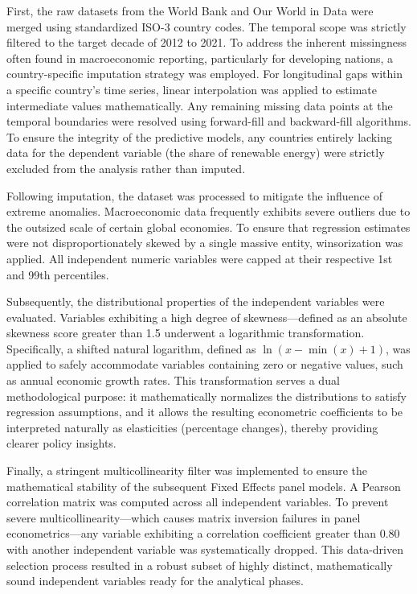 \documentclass[a4paper,11pt]{article}
\begin{document}
First, the raw datasets from the World Bank and Our World in Data were merged using standardized ISO-3 country codes.
The temporal scope was strictly filtered to the target decade of 2012 to 2021.
To address the inherent missingness often found in macroeconomic reporting, particularly for developing nations, a country-specific imputation strategy was employed.
For longitudinal gaps within a specific country's time series, linear interpolation was applied to estimate intermediate values mathematically.
Any remaining missing data points at the temporal boundaries were resolved using forward-fill and backward-fill algorithms.
To ensure the integrity of the predictive models, any countries entirely lacking data for the dependent variable (the share of renewable energy) were strictly excluded from the analysis rather than imputed.

Following imputation, the dataset was processed to mitigate the influence of extreme anomalies.
Macroeconomic data frequently exhibits severe outliers due to the outsized scale of certain global economies.
To ensure that regression estimates were not disproportionately skewed by a single massive entity, winsorization was applied.
All independent numeric variables were capped at their respective 1st and 99th percentiles.

Subsequently, the distributional properties of the independent variables were evaluated.
Variables exhibiting a high degree of skewness—defined as an absolute skewness score greater than 1.5 underwent a logarithmic transformation.
Specifically, a shifted natural logarithm, defined as $\ln(x - \min(x) + 1)$, was applied to safely accommodate variables containing zero or negative values, such as annual economic growth rates.
This transformation serves a dual methodological purpose: it mathematically normalizes the distributions to satisfy regression assumptions, and it allows the resulting econometric coefficients to be interpreted naturally as elasticities (percentage changes), thereby providing clearer policy insights.

Finally, a stringent multicollinearity filter was implemented to ensure the mathematical stability of the subsequent Fixed Effects panel models.
A Pearson correlation matrix was computed across all independent variables.
To prevent severe multicollinearity—which causes matrix inversion failures in panel econometrics—any variable exhibiting a correlation coefficient greater than 0.80 with another independent variable was systematically dropped.
This data-driven selection process resulted in a robust subset of highly distinct, mathematically sound independent variables ready for the analytical phases.
\end{document}
